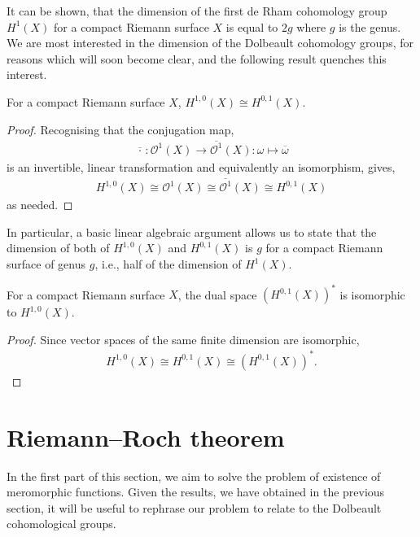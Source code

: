 It can be shown, that the
dimension of the first de Rham cohomology group $ H^1(X) $ for a compact Riemann
surface $ X $ is equal to $ 2g $ where $ g $ is the genus. We are most
interested in the dimension of the Dolbeault cohomology groups, for reasons
which will soon become clear, and the following result quenches this interest.

\begin{lemma}
	For a compact Riemann surface $ X $, $ H ^{1,0}(X) \cong H ^{0,1}(X) $.
	\begin{proof}
		Recognising that the conjugation map,
		\begin{align*}
			\overline{\, \cdot\,}: \mathcal{O}^{1}(X) \to \overline{\mathcal{O}^{1}}(X):
			\omega \mapsto \overline{\omega}
		\end{align*}
		is an invertible, linear transformation and equivalently an isomorphism,
		gives,
		\begin{align*}
			H ^{1,0}(X) \cong \mathcal{O}^{1}(X) \cong \overline{\mathcal{O}^{1}}(X)
			\cong H ^{0,1}(X)
		\end{align*}
		as needed.
	\end{proof}
\end{lemma}

In particular, a basic linear algebraic argument allows us to state that the
dimension of both of $ H ^{1,0}(X) $ and $ H ^{0,1}(X) $ is $ g $ for a compact
Riemann surface of genus $ g $, i.e., half of the dimension of $ H^1(X) $.

\begin{corollary}\label{cor:dual-space-iso}
	For a compact Riemann surface $ X $, the dual space $ ( H^{0,1}(X) )^{*} $ is
	isomorphic to $ H^{1,0}(X) $.
	\begin{proof}
		Since vector spaces of the same finite dimension are isomorphic,
		\begin{align*}
			H^{1,0}(X)\cong H^{0,1}(X)\cong ( H^{0,1}(X) )^{*}.
		\end{align*}
	\end{proof}
\end{corollary}

\section{Riemann--Roch theorem}\label{sec:riemann-roch}
In the first part of this section, we aim to solve the problem of existence of
meromorphic functions. Given the results, we have obtained in the previous
section, it will be useful to rephrase our problem to relate to the Dolbeault
cohomological groups.

